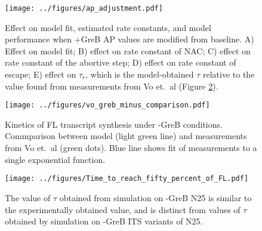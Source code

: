 \begin{figure}
    \begin{center}
      \texttt{[image: ../figures/ap\_adjustment.pdf]}
    \end{center}
    \caption{Effect on model fit, estimated rate constants, and model
      performance when +GreB AP values are modified from baseline. A) Effect on
      model fit; B) effect on rate constant of NAC; C) effect on rate constant of
      the abortive step; D) effect on rate constant of escape; E) effect on
      $\tau_r$, which is the model-obtained $\tau$ relative to the value found from
      measurements from Vo et.\ al \cite{vo_vitro_2003-1} (Figure
      \ref{fig:vo_comparison}).}
\label{fig:ap_adjustment}
\end{figure}


\begin{figure}
    \begin{center}
        \texttt{[image: ../figures/vo\_greb\_minus\_comparison.pdf]}
    \end{center}
    \caption{Kinetics of FL transcript synthesis under -GreB conditions.
      Commparison between model (light green line) and measurements from Vo
      et.\ al \cite{vo_vitro_2003-1} (green dots). Blue line shows fit of
      measurements to a single exponential function.}
\label{fig:vo_comparison}
\end{figure}


\begin{figure}
    \begin{center}
      \texttt{[image: ../figures/Time\_to\_reach\_fifty\_percent\_of\_FL.pdf]}
    \end{center}
    \caption{The value of $\tau$ obtained from simulation on -GreB N25 is
      similar to the experimentally obtained value, and is distinct from
      values of $\tau$ obtained by simulation on -GreB ITS variants of N25.}
\label{fig:its_variant_fl_comparison}
\end{figure}




